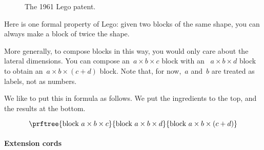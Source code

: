 \hfill


\begin{figure*}[p]
  \centering
%
  \caption{The 1961 Lego patent.}
\end{figure*}
Here is one formal property of Lego: given two blocks of the same shape, you can always make a block of twice the shape.

More generally, to compose blocks in this way, you would only care about the lateral dimensions.
You can compose an~$a \times b \times c$ block with an ~$a \times b \times d$ block to obtain an~$a \times b \times( c + d)$ block.
Note that, for now,~$a$ and~$b$ are treated as labels, not as numbers.

We like to put this in formula as follows. We put the ingredients to the top, and the results at the bottom.

\begin{equation}
  \prftree{\text{block } a \times b \times c}{\text{block } a \times b \times d }{%
    \text{block } a \times b \times (c+d)
  }
\end{equation}

\paragraph{Extension cords}


